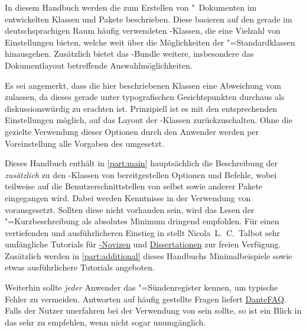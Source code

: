 \addchap[tocentry={}]{\prefacename}

In diesem Handbuch werden die zum Erstellen von "~Dokumenten 
im \href{https://tu-dresden.de/cd}{\TUDCD} entwickelten Klassen und Pakete 
beschrieben. Diese basieren auf den gerade im deutschsprachigen Raum häufig 
verwendeten \KOMAScript-Klassen, die eine Vielzahl von Einstellungen bieten, 
welche weit über die Möglichkeiten der "=Standardklassen 
hinausgehen. Zusätzlich bietet das \TUDScript-Bundle weitere, insbesondere das 
Dokumentlayout betreffende Auswahlmöglichkeiten.

Es sei angemerkt, dass die hier beschriebenen Klassen eine Abweichung vom 
\TUDCD zulassen, da dieses gerade unter typografischen Gesichtspunkten 
durchaus als diskussionswürdig zu erachten ist. Prinzipiell ist es mit den 
entsprechenden Einstellungen möglich, auf das Layout der \KOMAScript-Klassen 
zurückzuschalten. Ohne die gezielte Verwendung dieser Optionen durch den 
Anwender werden per Voreinstellung alle Vorgaben des \CDs umgesetzt.

Dieses Handbuch enthält in \autoref{part:main} hauptsächlich die Beschreibung 
der \emph{zusätzlich} zu den \KOMAScript-Klassen von \TUDScript bereitgestellen
Optionen und Befehle, wobei teilweise auf die Benutzerschnittstellen von 
\KOMAScript selbst sowie anderer Pakete eingegangen wird. Dabei werden 
Kenntnisse in der Verwendung von  vorausgesetzt. Sollten diese 
nicht vorhanden sein, wird das Lesen der "=Kurzbeschreibung 
 als absolutes 
Minimum dringend empfohlen. Für einen vertiefenden und ausführlicheren Einstieg 
in  stellt Nicola~L.~C.~Talbot sehr umfängliche Tutorials für 
\href{http://www.dickimaw-books.com/latex/novices/}{-Novizen} 
und \href{http://www.dickimaw-books.com/latex/thesis/}{Dissertationen} zur 
freien Verfügung. Zusätzlich werden in \autoref{part:additional} dieses 
Handbuchs Minimalbeispiele sowie etwas ausführlichere Tutorials angeboten.

Weiterhin sollte \emph{jeder} Anwender das "=Sündenregister 
kennen, um typische Fehler zu vermeiden. Antworten auf häufig gestellte Fragen 
liefert \href{http://projekte.dante.de/DanteFAQ/WebHome}{DanteFAQ}. Falls der 
Nutzer unerfahren bei der Verwendung von \KOMAScript sein sollte, so ist ein 
Blick in das  sehr zu empfehlen, wenn nicht 
sogar unumgänglich.

